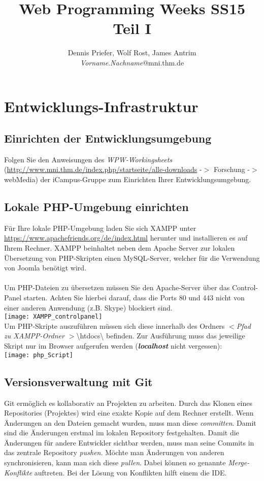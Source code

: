 \documentclass[]{article}
\title{Web Programming Weeks SS15\\Teil I}
\author{Dennis Priefer, Wolf Rost, James Antrim\\\textit{Vorname}.\textit{Nachname}@mni.thm.de}
\begin{document}
\maketitle

\section{Entwicklungs-Infrastruktur}
\subsection{Einrichten der Entwicklungsumgebung}
Folgen Sie den Anweisungen des \textit{WPW-Workingsheets} (\url{http://www.mni.thm.de/index.php/startseite/alle-downloads} -$ > $ Forschung -$ > $ webMedia) der iCampus-Gruppe zum Einrichten Ihrer Entwicklungsumgebung.
\subsection{Lokale PHP-Umgebung einrichten}
Für Ihre lokale PHP-Umgebung laden Sie sich XAMPP unter \url{https://www.apachefriends.org/de/index.html} herunter und installieren es auf Ihrem Rechner. XAMPP beinhaltet neben dem Apache Server zur lokalen Übersetzung von PHP-Skripten einen MySQL-Server, welcher für die Verwendung von Joomla benötigt wird.\\
\\
Um PHP-Dateien zu übersetzen müssen Sie den Apache-Server über das Control-Panel starten. Achten Sie hierbei darauf, dass die Ports 80 und 443 nicht von einer anderen Anwendung (z.B. Skype) blockiert sind.\\
\texttt{[image: XAMPP\_controlpanel]}\\
Um PHP-Skripte auszuführen müssen sich diese innerhalb des Ordners \textit{$<$Pfad zu XAMPP-Ordner $>$}\textbackslash{}htdocs\textbackslash{} befinden. Zur Ausführung muss das jeweilige Skript nur im Browser aufgerufen werden (\textbf{\textit{localhost}} nicht vergessen):\\
\texttt{[image: php\_Script]}

\subsection{Versionsverwaltung mit Git}
Git ermöglich es kollaborativ an Projekten zu arbeiten.
Durch das Klonen eines Repositories (Projektes) wird eine exakte Kopie auf dem Rechner erstellt. Wenn Änderungen an den Dateien gemacht wurden, muss man diese \textit{committen}. Damit sind die Änderungen erstmal im lokalen Repository festgehalten. Damit die Änderungen für andere Entwickler sichtbar werden, muss man seine Commits in das zentrale Repository \textit{pushen}. Möchte man Änderungen von anderen synchronisieren, kann man sich diese \textit{pullen}. Dabei können so genannte \textit{Merge-Konflikte} auftreten. Bei der Lösung von Konflikten hilft einem die IDE.\\
\end{document}
